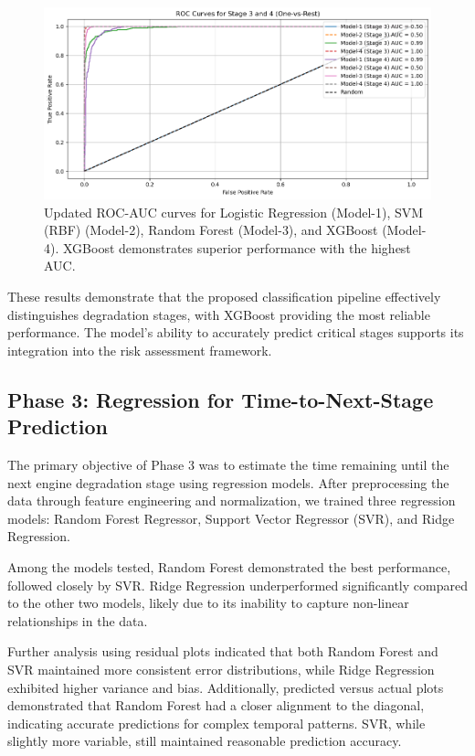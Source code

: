 \documentclass[conference]{IEEEtran}
\begin{document}
\begin{figure}[h]
    \centering
    \includegraphics[width=0.8\linewidth]{roc_auc.png}
    \caption{Updated ROC-AUC curves for Logistic Regression (Model-1), SVM (RBF) (Model-2), Random Forest (Model-3), and XGBoost (Model-4). XGBoost demonstrates superior performance with the highest AUC.}
    \label{fig:roc_auc}
\end{figure}

These results demonstrate that the proposed classification pipeline effectively distinguishes degradation stages, with XGBoost providing the most reliable performance. The model’s ability to accurately predict critical stages supports its integration into the risk assessment framework.


\subsection{Phase 3: Regression for Time-to-Next-Stage Prediction}

The primary objective of Phase 3 was to estimate the time remaining until the next engine degradation stage using regression models. After preprocessing the data through feature engineering and normalization, we trained three regression models: Random Forest Regressor, Support Vector Regressor (SVR), and Ridge Regression. 

Among the models tested, Random Forest demonstrated the best performance, followed closely by SVR. Ridge Regression underperformed significantly compared to the other two models, likely due to its inability to capture non-linear relationships in the data. 

Further analysis using residual plots indicated that both Random Forest and SVR maintained more consistent error distributions, while Ridge Regression exhibited higher variance and bias. Additionally, predicted versus actual plots demonstrated that Random Forest had a closer alignment to the diagonal, indicating accurate predictions for complex temporal patterns. SVR, while slightly more variable, still maintained reasonable prediction accuracy.
\end{document}
